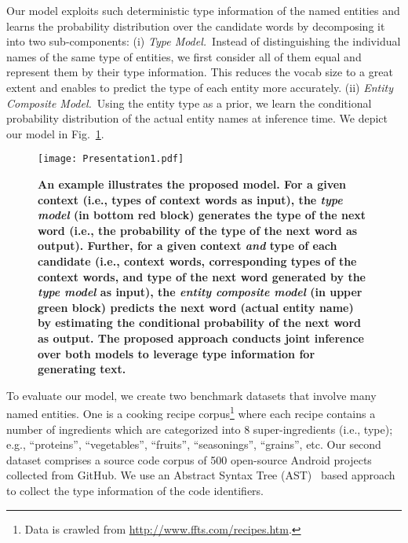 \documentclass[11pt,a4paper]{article}
\begin{document}
Our model exploits such deterministic type information of the named entities and learns the probability distribution over the candidate words by decomposing it into two sub-components:
(i) {\em Type Model.}~Instead of distinguishing the individual names of the same type of entities, we first consider all of them equal and represent them by their type information.  This reduces the vocab size to a great extent and enables to predict the type of each entity more accurately.
(ii) {\em  Entity Composite Model.}~Using the entity type as a prior, we learn the conditional probability distribution of the actual entity names at inference time. We depict our model in Fig.~\ref{fig:model}.







\begin{figure}[t]
\texttt{[image: Presentation1.pdf]}
\caption{\textbf{\small An example illustrates the proposed model. For a given context (i.e., types of context words as input), the \textit{type model} (in  bottom red block)  generates the type of the next word (i.e., the probability of the type of the next word as output). Further, for a given context {\em and} type of each candidate (i.e., context words, corresponding types of the context words, and type of the next word generated by the \textit{type model} as input), the \textit{entity composite model} (in upper green block) predicts the next word (actual entity name) by estimating the conditional probability of the next word as output. The proposed approach conducts joint inference over both models to leverage type information for generating text.}}




\label{fig:model}
\end{figure}



To evaluate our model, we create two benchmark datasets that involve many named entities. One is a cooking recipe corpus\footnote{ Data is crawled from \url{http://www.ffts.com/recipes.htm}.} where each recipe contains a number of ingredients which are categorized into 8 super-ingredients (i.e., type);  e.g., ``proteins'', ``vegetables'', ``fruits'', ``seasonings'', ``grains'', etc.  
Our second dataset comprises a source code corpus of  500 open-source Android projects collected from GitHub. We use an Abstract Syntax Tree (AST)~\cite{parsons1992introduction} based approach to collect the type information of the code identifiers. 
\end{document}

